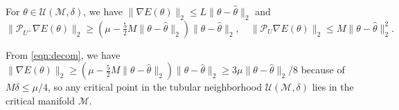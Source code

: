 \documentclass[final]{siamart251216}
\begin{document}
\begin{lemma}\label{lemma:decom}
For $\theta \in \mathcal{U}(\mathcal{M},\delta)$, we have 
$\|\nabla E(\theta)\|_2\leqslant L\|\theta-\hat\theta\|_2$ and
\begin{equation}\label{eqn:decom}
\|\mathcal{P}_{U^\perp}\nabla E(\theta)\|_2 \geqslant
\left(\mu-\tfrac{5}{2}M\|\theta-\hat\theta\|_2\right)
\|\theta-\hat\theta\|_2,
\quad
\|\mathcal{P}_{U}\nabla E(\theta)\|_2 \leqslant
M\|\theta-\hat\theta\|_2^2.
\end{equation}
\end{lemma}
\begin{remark}\label{rmk:unique}
From \eqref{eqn:decom}, we have 
$\|\nabla E(\theta)\|_2\geqslant
\left(\mu-\tfrac{5}{2}M\|\theta-\hat\theta\|_2\right)
\|\theta-\hat\theta\|_2
\geqslant 3\mu\|\theta-\hat\theta\|_2/8$ because of $M\delta\leqslant \mu/4$, so
any critical point in the tubular neighborhood $\mathcal{U}(\mathcal{M},\delta)$ lies in the critical manifold $\mathcal{M}$. 
\end{remark}
\end{document}
